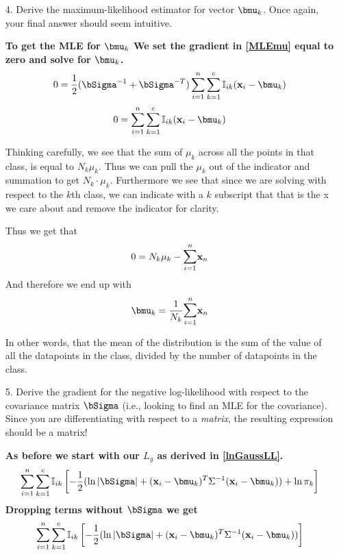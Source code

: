 \documentclass[submit]{harvardml}
\newenvironment{answer}{%
    \color{answergreen}\bf}
  {%
  }
\begin{document}
\begin{enumerate}
\begin{answer}
    \end{answer}

  \item[4.] Derive the maximum-likelihood estimator for vector $\bmu_k$. Once
    again, your final answer should seem intuitive.

    \begin{answer}
        To get the MLE for $\bmu_k$ We set the gradient in \eqref{MLEmu} equal to zero and
        solve for $\bmu_k$.
        $$
         0 = \frac{1}{2} 
             (\bSigma^{-1} + \bSigma^{-T})
             \sum_{i=1}^n \sum_{k=1}^c \mBI 
             (\bx_i - \bmu_k) 
             $$
             $$
         0 = \sum_{i=1}^n \sum_{k=1}^c \mBI 
             (\bx_i - \bmu_k) 
        $$

        Thinking carefully, we see that the sum of $\mu_k$ across all the
        points in that class, is equal to $N_k \mu_k$. Thus we can pull the
        $\mu_k$ out of the indicator and summation to get $N_k \cdot \mu_k$.
        Furthermore we see that since we are solving with respect to the $k$th
        class, we can indicate with a $k$ subscript that that is the x we care
        about and remove the indicator for clarity.

        Thus we get that 
        $$ 
        0 = N_k \mu_k - \lsum_{i=1}^n \bx_n
        $$
        And therefore we end up with
        \begin{equation}
            \bmu_k = \frac{1}{N_k} \lsum_{i=1}^n \bx_n
        \end{equation}

        In other words, that the mean of the distribution is the sum of the
        value of all the datapoints in the class, divided by the number of datapoints in the
        class.
    \end{answer}

  \item[5.] Derive the gradient for the negative log-likelihood with respect to the
    covariance matrix $\bSigma$ (i.e., looking to find an MLE for the covariance). 
    Since you are differentiating with respect to a \emph{matrix}, the resulting expression should be a matrix!

 \begin{answer} 
     As before we start with our $L_g$ as derived in \eqref{lnGaussLL}.
        \begin{equation}
            \sum_{i=1}^n \sum_{k=1}^c \mBI \left[ 
            -\frac{1}{2} (
                \ln|\bSigma|+(\bx_i-\bmu_k)^T\Sigma^{-1} (\bx_i-\bmu_k) )
                + \ln\pi_k \right] 
        \end{equation}
        Dropping terms without $\bSigma$ we get
        \begin{equation}
            \sum_{i=1}^n \sum_{k=1}^c \mBI \left[ 
            -\frac{1}{2} (
                \ln|\bSigma|+(\bx_i-\bmu_k)^T\Sigma^{-1} (\bx_i-\bmu_k) )
                \right] 
        \end{equation}



\end{answer}
\end{enumerate}
\end{document}
